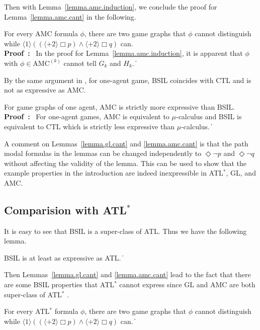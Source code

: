 \documentclass[11pt]{article}
\newcommand{\pf}{\noindent\mbox{\bf Proof : }}
\newcommand{\pfrr}{\Box}
\newcommand{\pevt}{\Diamond}
\def\qed{\ifmmode\|\else{\unskip\nobreak\hfil
\penalty50\hskip1em\null\nobreak\hfil$\blacksquare$
\parfillskip=0pt\finalhyphendemerits=0\endgraf}\fi}
\begin{document}
Then with Lemma~\ref{lemma.amc.induction}, 
we conclude the proof for Lemma~\ref{lemma.amc.cant} in the following. 


{\lemma \label{lemma.amc.cant}
For every AMC formula $\phi$,
there are two game graphs that
$\phi$ cannot distinguish while
$\langle 1\rangle ((\langle+ 2\rangle\pfrr p)
    \wedge \langle+ 2\rangle\pfrr q)$ can.
}
\\\pf 
In the proof for Lemma~\ref{lemma.amc.induction}, 
it is apparent that $\phi$ with $\phi\in\mbox{AMC}^{(k)}$ cannot 
tell $G_k$ and $H_k$.  
\qed 

By the same argument in \cite{AHK02}, 
for one-agent game, BSIL coincides with CTL and is not as expressive as 
AMC. 

{\lemma \label{lemma.amc.can}
For game graphs of one agent,
AMC is strictly more expressive than BSIL.} 
\\\pf 
For one-agent games, 
AMC is equivalent to $\mu$-calculus and BSIL is equivalent to CTL which
is strictly less expressive than $\mu$-calculus.
\qed 



A comment on Lemmas~\ref{lemma.gl.cant} and \ref{lemma.amc.cant} 
is that the path modal formulas in the lemmas can be changed 
independently to $\pevt \neg p$ and $\pevt \neg q$ without affecting the validity of 
the lemma.  
This can be used to show that the example properties in the introduction 
are indeed inexpressible in ATL$^*$, GL, and AMC.  


\subsection{Comparision with ATL$^*$ \label{subsec.exp.atl} }

It is easy to see that BSIL is a super-class of ATL.
Thus we have the following lemma.

{\lemma \label{lemma.atl.less}
BSIL is at least as expressive as ATL.  
}
\qed

Then Lemmas~\ref{lemma.gl.cant} and \ref{lemma.amc.cant} 
lead to the 
fact that there are some BSIL properties that 
ATL$^*$ cannot express 
since GL and AMC are both super-class of ATL$^*$ \cite{AHK02}.  



{\lemma \label{lemma.atl.cant} 
For every ATL$^*$ formula $\phi$, 
there are two game graphs that
$\phi$ cannot distinguish while
$\langle 1\rangle ((\langle+ 2\rangle\pfrr p)
    \wedge \langle+ 2\rangle\pfrr q)$ can.
}\qed 
\end{document}
